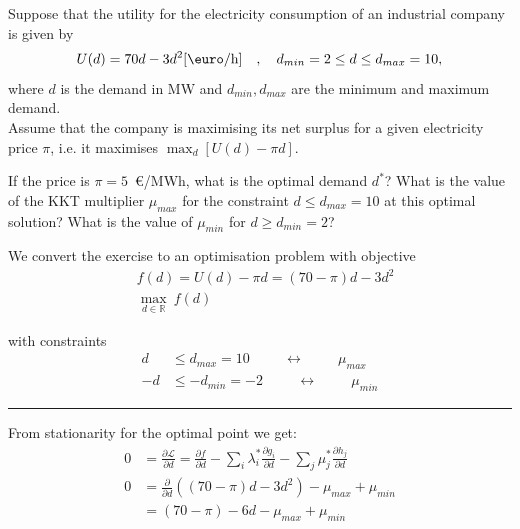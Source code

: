 \documentclass[11pt,a4paper,fleqn]{scrartcl}
\def\m{\mu}
\def\d{\partial}
\begin{document}
Suppose that the utility for the electricity consumption of an industrial company is given by
\[
U(d) = 70d - 3d^2 [\textrm{\euro}/\si{\hour}] \quad , \quad d_{min}=2\leq d \leq d_{max}=10,
\]
where $d$ is the demand in MW and $d_{min}, d_{max}$ are the minimum and maximum demand. \\
[1em]
Assume that the company is maximising its net surplus for a given electricity price $\pi$, i.e. it maximises $\max_{d} \left[U(d) -
\pi d\right]$.
\begin{enumerate}[(a)]
 \begin{shaded} \item If the price is $\pi = 5$~\euro/MWh, what is the optimal
  demand $d^*$?  What is the value of the KKT multiplier $\mu_{max}$
  for the constraint $d \leq d_{max}=10$ at this optimal solution?
  What is the value of $\mu_{min}$ for $d \geq d_{min} = 2$?\end{shaded}
 We convert the exercise to an optimisation problem with objective
 \begin{align}
  &f(d) = U(d) - \pi d = (70-\pi) d - 3d^2 \\
  &\max\limits_{d \in \mathbb{R}} \ f(d)
 \end{align}

 with constraints
 \begin{align}
  d  & \leq d_{max} = 10 \hspace{1cm}\leftrightarrow\hspace{1cm} \m_{max}  \\
  -d & \leq -d_{min} = -2 \hspace{1cm}\leftrightarrow\hspace{1cm} \m_{min}
 \end{align}
 \rule{\textwidth}{0.4pt}
 From stationarity for the optimal point we get:
 \begin{align}
  0 & =   \frac{\d \mathcal{L}}{\d d} = \frac{\d f}{\d d} - \sum_{i} \lambda_i^* \frac{\d g_i}{\d d} -  \sum_{j} \mu_j^* \frac{\d h_j}{\d d}\\
  0 & =   \frac{\d}{\d d} \left((70-\pi) d - 3d^2 \right) - \m_{max} + \m_{min} \\
    & =  (70-\pi) - 6d - \m_{max} + \m_{min} \label{eq:2stat}
 \end{align}


\end{enumerate}
\end{document}
